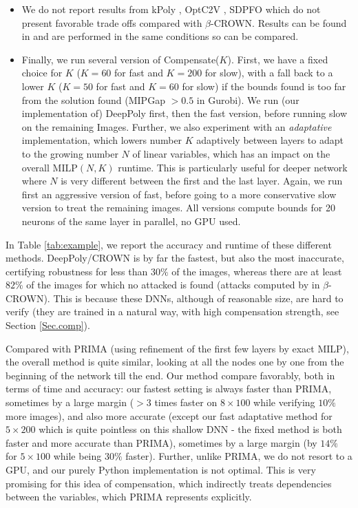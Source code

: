 \documentclass{llncs}
\newcommand{\MILP}{{\textrm{MILP}}}
\begin{document}
\begin{itemize}
	\item We do not report results from kPoly \cite{kpoly}, OptC2V \cite{optC2V}, 
	SDPFO \cite{SDPFI} which do not present favorable trade offs compared with $\beta$-CROWN. Results can be found in \cite{crown} and are performed in the same conditions so can be compared.
	\item Finally, we run several version of Compensate($K$). First, we have a fixed choice for $K$ ($K=60$ for fast and $K=200$ for slow), with a fall back to a lower $K$ ($K=50$ for fast and $K=60$ for slow) if the bounds found is too far from the solution found (MIPGap $>0.5$ in Gurobi). We run (our implementation of) DeepPoly first, then the fast version, before running slow on the remaining Images.
	Further, we also experiment with an {\em adaptative} implementation, which lowers number $K$ adaptively between layers to adapt to the growing number $N$ of linear variables, which has an impact on the overall $\MILP(N,K)$ runtime. This is particularly useful for deeper network where $N$ is very different between the first and the last layer. Again, we run first an aggressive version of fast, before going to a more conservative slow version to treat the remaining images. All versions compute bounds for 20 neurons of the same layer in parallel, no GPU used.
\end{itemize}


In Table \ref{tab:example}, we report the accuracy and runtime of these different methods.
DeepPoly/CROWN is by far the fastest, but also the most inaccurate, certifying robustness for less than $30\%$ of the images, whereas there are at least $82\%$ of the images for which no attacked is found (attacks computed by \cite{attack} in $\beta$-CROWN).
This is because these DNNs, although of reasonable size, are hard to verify (they are trained in a natural way, with high compensation strength, see Section \ref{Sec.comp}).


Compared with PRIMA (using refinement of the first few layers by exact MILP), the overall method is quite similar, looking at all the nodes one by one from the beginning of the network till the end. Our method compare favorably, both in terms of time and accuracy: our fastest setting is always faster than PRIMA, sometimes by a large margin ($>3$ times faster on $8 \times 100$ while verifying $10\%$ more images), and also more accurate (except our fast adaptative method for $5 \times 200$ which is quite pointless on this shallow DNN - the fixed method is both faster and more accurate than PRIMA), sometimes by a large margin (by $14 \%$  for $5 \times 100$ while being $30\%$ faster). Further, unlike PRIMA, we do not resort to a GPU, and our purely Python implementation is not optimal. This is very promising for this idea of compensation, which indirectly treats dependencies between the variables, which PRIMA represents explicitly.
\end{document}
